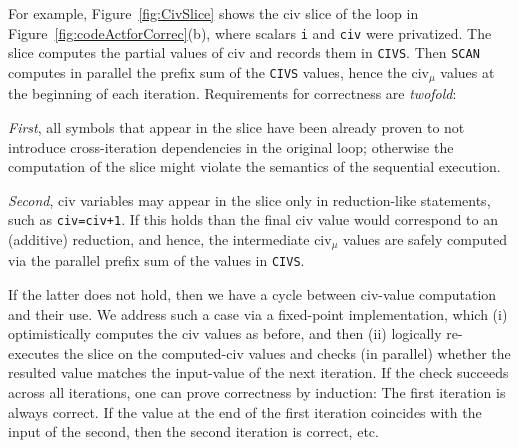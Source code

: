 \documentclass{sig-alternate}
\begin{document}
For example, Figure~\ref{fig:CivSlice} shows the {\sc civ} slice of the loop
in Figure~\ref{fig:codeActforCorrec}(b), where scalars {\tt i} and {\tt civ}
were privatized. The slice computes the partial values of 
{\sc civ} and records them in {\tt CIVS}. Then {\tt SCAN}
computes in parallel the prefix sum of the {\tt CIVS} values, 
hence the {\sc civ}$_\mu$ values at the beginning of each iteration. 
%
Requirements for correctness are {\em twofold}:  

{\em First}, all symbols that appear in the slice have been already proven 
to not introduce cross-iteration dependencies in the original loop; otherwise 
the computation of the slice might violate the semantics of the sequential execution. 

{\em Second}, {\sc civ} variables may appear in the slice only in reduction-like statements, 
such as {\tt civ=civ+1}.
If this holds than the final {\sc civ} value would correspond to an (additive) reduction, 
and hence, the intermediate {\sc civ}$_\mu$ values are safely computed via the parallel 
prefix sum of the values in {\tt CIVS}. 

If the latter does not hold, %
then we have a cycle between {\sc civ}-value computation and their use.   
We address such a case via a fixed-point implementation,
which (i) optimistically computes the {\sc civ} values as before, and then (ii) logically 
re-executes the slice on the computed-{\sc civ} values and checks (in parallel) 
whether the resulted value matches the input-value of the next iteration. 
%
If the check succeeds across all iterations, one can prove correctness by induction:
The first iteration is always correct. If the value at the end of the first iteration 
coincides with the input of the second, then the second iteration 
is correct, etc.%

\end{document}
